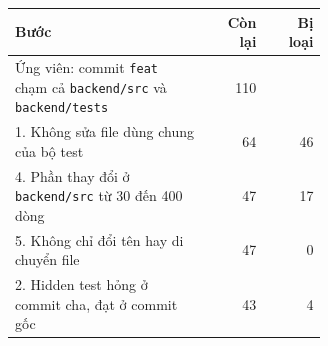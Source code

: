 \begin{tabular}{p{0.62\linewidth}rr}
\toprule
Bước & Còn lại & Bị loại \\
\midrule
Ứng viên: commit \texttt{feat} chạm cả \texttt{backend/src} và \texttt{backend/tests} & 110 &  \\
1. Không sửa file dùng chung của bộ test & 64 & 46 \\
4. Phần thay đổi ở \texttt{backend/src} từ 30 đến 400 dòng & 47 & 17 \\
5. Không chỉ đổi tên hay di chuyển file & 47 & 0 \\
2. Hidden test hỏng ở commit cha, đạt ở commit gốc & 43 & 4 \\
\bottomrule
\end{tabular}
